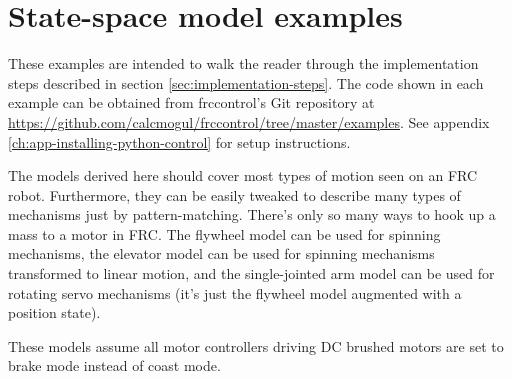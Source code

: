 
\chapter{State-space model examples}

These examples are intended to walk the reader through the implementation steps
described in section \ref{sec:implementation-steps}. The code shown in each
example can be obtained from frccontrol's Git repository at
\url{https://github.com/calcmogul/frccontrol/tree/master/examples}.
See appendix \ref{ch:app-installing-python-control} for setup instructions.

The models derived here should cover most types of motion seen on an FRC robot.
Furthermore, they can be easily tweaked to describe many types of mechanisms
just by pattern-matching. There's only so many ways to hook up a mass to a motor
in FRC. The flywheel model can be used for spinning mechanisms, the elevator
model can be used for spinning mechanisms transformed to linear motion, and the
single-jointed arm model can be used for rotating servo mechanisms (it's just
the flywheel model augmented with a position state).

These models assume all motor controllers driving DC brushed motors are set to
brake mode instead of coast mode.







